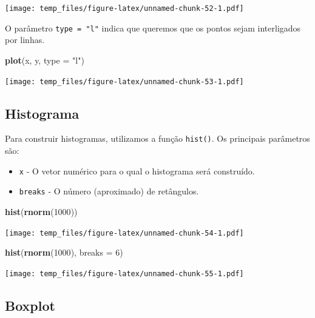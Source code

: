 \documentclass[]{book}
\newenvironment{Shaded}{\begin{snugshade}}{\end{snugshade}}
\newcommand{\DataTypeTok}[1]{\textcolor[rgb]{0.13,0.29,0.53}{#1}}
\newcommand{\DecValTok}[1]{\textcolor[rgb]{0.00,0.00,0.81}{#1}}
\newcommand{\KeywordTok}[1]{\textcolor[rgb]{0.13,0.29,0.53}{\textbf{#1}}}
\newcommand{\NormalTok}[1]{#1}
\newcommand{\StringTok}[1]{\textcolor[rgb]{0.31,0.60,0.02}{#1}}
\providecommand{\tightlist}{%
  \setlength{\itemsep}{0pt}\setlength{\parskip}{0pt}}
\begin{document}
\texttt{[image: temp\_files/figure-latex/unnamed-chunk-52-1.pdf]}

O parâmetro \texttt{type\ =\ "l"} indica que queremos que os pontos sejam interligados por linhas.

\begin{Shaded}
\begin{Highlighting}[]
\KeywordTok{plot}\NormalTok{(x, y, }\DataTypeTok{type =} \StringTok{"l"}\NormalTok{)}
\end{Highlighting}
\end{Shaded}

\texttt{[image: temp\_files/figure-latex/unnamed-chunk-53-1.pdf]}

\hypertarget{histograma}{%
\subsection{Histograma}\label{histograma}}

Para construir histogramas, utilizamos a função \texttt{hist()}. Os principais parâmetros são:

\begin{itemize}
\tightlist
\item
  \texttt{x} - O vetor numérico para o qual o histograma será construído.
\item
  \texttt{breaks} - O número (aproximado) de retângulos.
\end{itemize}

\begin{Shaded}
\begin{Highlighting}[]
\KeywordTok{hist}\NormalTok{(}\KeywordTok{rnorm}\NormalTok{(}\DecValTok{1000}\NormalTok{))}
\end{Highlighting}
\end{Shaded}

\texttt{[image: temp\_files/figure-latex/unnamed-chunk-54-1.pdf]}

\begin{Shaded}
\begin{Highlighting}[]
\KeywordTok{hist}\NormalTok{(}\KeywordTok{rnorm}\NormalTok{(}\DecValTok{1000}\NormalTok{), }\DataTypeTok{breaks =} \DecValTok{6}\NormalTok{)}
\end{Highlighting}
\end{Shaded}

\texttt{[image: temp\_files/figure-latex/unnamed-chunk-55-1.pdf]}

\hypertarget{boxplot}{%
\subsection{Boxplot}\label{boxplot}}
\end{document}
